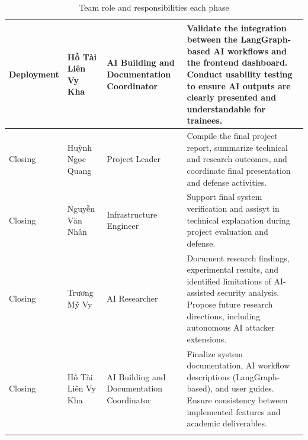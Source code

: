 \begin{longtable}{|p{2.5cm}|p{3.0cm}|p{2.8cm}|p{5.2cm}|}
	\hline
	Deployment & Hồ Tài Liên Vy Kha & AI Building and Documentation Coordinator & Validate the integration between the LangGraph-based AI workflows and the frontend dashboard. Conduct usability testing to ensure AI outputs are clearly presented and understandable for trainees. \\
	\hline
	Closing & Huỳnh Ngọc Quang & Project Leader & Compile the final project report, summarize technical and research outcomes, and coordinate final presentation and defense activities. \\
	\hline
	Closing & Nguyễn Văn Nhân & Infrastructure Engineer & Support final system verification and assisyt in technical explanation during project evaluation and defense. \\
	\hline
	Closing & Trương Mỹ Vy & AI Researcher & Document research findings, experimental results, and identified limitations of AI-assisted security analysis. Propose future research directions, including autonomous AI attacker extensions. \\
	\hline
	Closing & Hồ Tài Liên Vy Kha & AI Building and Documentation Coordinator & Finalize system documentation, AI workflow descriptions (LangGraph-based), and user guides. Ensure consistency between implemented features and academic deliverables. \\
	\hline
	\caption{Team role and responsibilities each phase} \\
\end{longtable}

